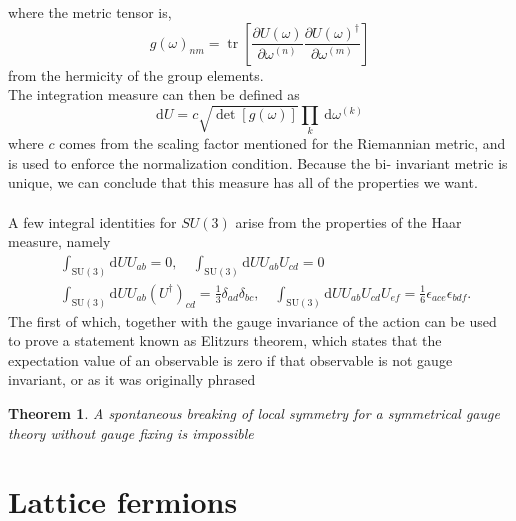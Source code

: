 \documentclass[a4paper,10pt]{book}
\newtheorem{theorem}{Theorem}
\begin{document}
where the metric tensor is,
$$
g(\omega)_{n m}=\operatorname{tr}\left[\frac{\partial U(\omega)}{\partial \omega^{(n)}} \frac{\partial U(\omega)^{\dagger}}{\partial \omega^{(m)}}\right]
$$
from the hermicity of the group elements.\\
The integration measure can then be defined as
\begin{equation}
\mathrm{d} U=c \sqrt{\operatorname{det}[g(\omega)]} \prod_{k} \mathrm{~d} \omega^{(k)}
\end{equation}
where $c$ comes from the scaling factor mentioned for the Riemannian metric, and is used to enforce the normalization condition.
Because the bi- invariant metric is unique, we can conclude that this measure has all of the properties we want.\\\\A few integral identities for $SU(3)$ arise from the properties of the Haar measure, namely
\begin{equation}
\begin{aligned}
&\int_{\mathrm{SU}(3)} \mathrm{d} U U_{a b}=0, \quad
\int_{\mathrm{SU}(3)} \mathrm{d} U U_{a b} U_{c d}=0 \\
&\int_{\mathrm{SU}(3)} \mathrm{d} U U_{a b}\left(U^{\dagger}\right)_{c d}=\frac{1}{3} \delta_{a d} \delta_{b c},\quad
\int_{\mathrm{SU}(3)} \mathrm{d} U U_{a b} U_{c d} U_{e f}=\frac{1}{6} \epsilon_{a c e} \epsilon_{b d f}.
\end{aligned}
\end{equation}
The first of which, together with the gauge invariance of the action can be used to prove a statement known as Elitzurs theorem, which states that the expectation value of an observable is zero if that observable is not gauge invariant, or as it was originally phrased\cite{1975PhRvD}
\begin{theorem}
A spontaneous breaking of local symmetry for a symmetrical gauge theory without gauge fixing is impossible
\end{theorem}
\section{Lattice fermions}
\end{document}
